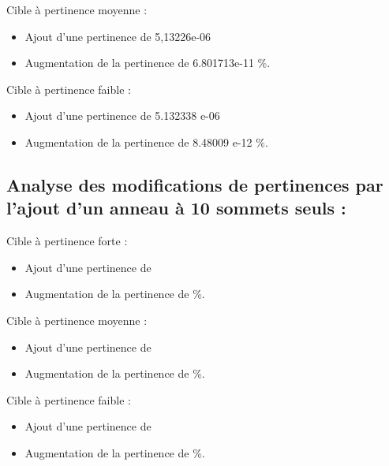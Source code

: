 \documentclass[a4paper,11pt]{article}
\begin{document}
		Cible à pertinence moyenne :
		\begin{itemize} 	
			\item Ajout d'une pertinence de 5,13226e-06
			\item Augmentation de la pertinence de 6.801713e-11 \%.
		\end{itemize}
		
		Cible à pertinence faible :
		\begin{itemize} 	
			\item Ajout d'une pertinence de 5.132338 e-06
			\item Augmentation de la pertinence de 8.48009 e-12 \%.
		\end{itemize}

	\subsection{Analyse des modifications de pertinences par l'ajout d'un anneau à 10 sommets seuls :}
	Cible à pertinence forte :
		\begin{itemize} 	
			\item Ajout d'une pertinence de 
			\item Augmentation de la pertinence de  \%.
		\end{itemize}
		
		Cible à pertinence moyenne :
		\begin{itemize} 	
			\item Ajout d'une pertinence de 
			\item Augmentation de la pertinence de  \%.
		\end{itemize}
		
		Cible à pertinence faible :
		\begin{itemize} 	
			\item Ajout d'une pertinence de 
			\item Augmentation de la pertinence de  \%.
		\end{itemize}
\end{document}
